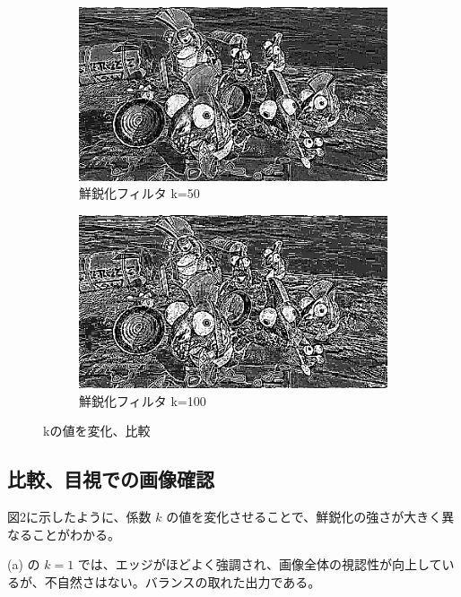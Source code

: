 \documentclass[a4paper,11pt,titlepage]{jsarticle}
\begin{document}
\begin{figure}[htbp]
  \begin{subfigure}{0.4\textwidth}
    \includegraphics[width=\linewidth]{syake_unsharp_masked_3x3_k=50.png}
    \caption{鮮鋭化フィルタ k=50}
  \end{subfigure}
  \hfill
  \begin{subfigure}{0.4\textwidth}
    \includegraphics[width=\linewidth]{syake_unsharp_masked_3x3_k=100.png}
    \caption{鮮鋭化フィルタ k=100}
  \end{subfigure}

  \caption{kの値を変化、比較}
\end{figure}

\subsection{比較、目視での画像確認}

図2に示したように、係数 $k$ の値を変化させることで、鮮鋭化の強さが大きく異なることがわかる。

(a) の $k=1$ では、エッジがほどよく強調され、画像全体の視認性が向上しているが、不自然さはない。バランスの取れた出力である。
\end{document}
